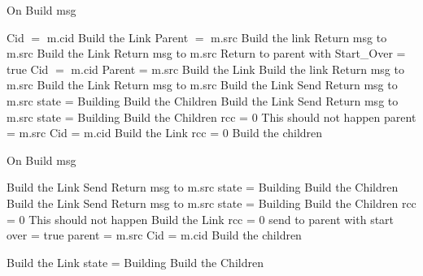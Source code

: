 \documentclass{article}
\begin{document}
\begin{algorithm}
\caption{On Build msg}
\label{Build message received}
\begin{algorithmic}[1]
			\State Cid $=$ m.cid
			\State Build the Link
			\State Parent $=$ m.src
			\State Build the link 
			\State Return msg to m.src
		\Else
			\State Build the Link
			\State Return msg to m.src
		\EndIf
	\Else
			\State Return to parent with Start\_Over = true
			\State Cid $=$ m.cid
			\State Parent = m.src
			\State Build the Link
			\State Build the link
			\State Return msg to m.src
		\Else
			\State Build the Link
			\State Return msg to m.src
		\EndIf
	\EndIf
{}
			\State Build the Link
			\State Send Return msg to m.src
			\State state = Building
			\State Build the Children
			\State Build the Link
			\State Send Return msg to m.src
				\State state = Building	
				\State Build the Children
				\State rcc = 0
			\EndIf
			\State This should not happen
		\Else
			\State parent = m.src
			\State Cid = m.cid
			\State Build the Link
			\State rcc = 0
			\State Build the children
		\EndIf

\end{algorithmic}
\end{algorithm}	


\begin{algorithm}
\caption{On Build msg}
\label{Build message received}
\begin{algorithmic}[1]
	\Else
			\State Build the Link
			\State Send Return msg to m.src
			\State state = Building
			\State Build the Children
			\State Build the Link
			\State Send Return msg to m.src
				\State state = Building	
				\State Build the Children
				\State rcc = 0
			\EndIf
			\State This should not happen
		\Else
			\State Build the Link
			\State rcc = 0
			\State send to parent with start over = true
			\State parent = m.src
			\State Cid = m.cid
			\State Build the children
		\EndIf
	\EndIf

	\State Build the Link
	\State state = Building
	\State Build the Children
\EndIf
\EndProcedure
\end{algorithmic}
\end{algorithm}	
\end{document}
